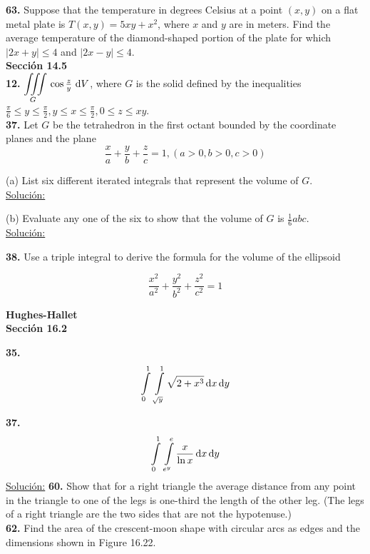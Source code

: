 \documentclass[11pt]{report}
\newcommand{\s}{\underline{Soluci\'{o}n:}}
\begin{document}
\textbf{63.} Suppose that the temperature in degrees Celsius at a point $(x, y)$
on a flat metal plate is $T(x, y) = 5xy + x^2 $, where $x$ and $y$ are in meters.
Find the average temperature of the diamond-shaped portion of the plate for which
$|2x + y| \leq 4$ and $|2x - y| \leq 4$. \\

\textbf{Sección 14.5} \\

\textbf{12.} $ {\displaystyle \iiint \limits_G } \, \cos{\frac{z}{y}} \, \, \text dV $,
where $G$ is the solid defined by the inequalities
$\frac{\pi}{6} \leq y \leq \frac{\pi}{2}, y \leq x \leq \frac{\pi}{2}, 0 \leq z \leq xy$. \\


\textbf{37.} Let $G$ be the tetrahedron in the first octant bounded by the
coordinate planes and the plane \\

\[ \frac{x}{a} + \frac{y}{b} + \frac{z}{c} = 1, (a > 0, b > 0, c > 0) \]

(a) List six different iterated integrals that represent the volume of $G$. \\
\s

(b) Evaluate any one of the six to show that the volume of $G$ is $\frac{1}{6} abc$. \\
\s

\textbf{38.} Use a triple integral to derive the formula for the volume of the ellipsoid

\[ \frac{x^2}{a^2} + \frac{y^2}{b^2} + \frac{z^2}{c^2} = 1 \]

\textbf{Hughes-Hallet} \\

\textbf{Sección 16.2}

\textbf{35.} \\

\[ \int \limits_0^1 \, \int \limits_{\sqrt{y}}^1 \sqrt{2 + x^3} \, \text dx \, \text dy \]

\textbf{37.} \\

\[ \int \limits_0^1 \, \int \limits_{e^y}^e \frac{x}{\ln{x}} \, \text dx \, \text dy \]
\s
\textbf{60.} Show that for a right triangle the average distance from any point
in the triangle to one of the legs is one-third the length of the other leg.
(The legs of a right triangle are the two sides that are not the hypotenuse.) \\

\textbf{62.} Find the area of the crescent-moon shape with circular arcs as edges
and the dimensions shown in Figure 16.22. \\
\end{document}
